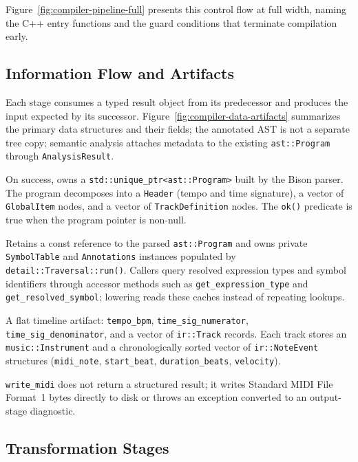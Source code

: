 Figure~\ref{fig:compiler-pipeline-full} presents this control flow at full width, naming the C++ entry functions and
the guard conditions that terminate compilation early.

\subsection{Information Flow and Artifacts}\label{detail-subsec:information-flow-and-artifacts}

Each stage consumes a typed result object from its predecessor and produces the input expected by its successor.
Figure~\ref{fig:compiler-data-artifacts} summarizes the primary data structures and their fields; the annotated AST is
not a separate tree copy; semantic analysis attaches metadata to the existing \texttt{ast::Program} through
\texttt{AnalysisResult}.

On success, owns a \texttt{std::unique\_ptr\textless ast::Program\textgreater{}} built by the Bison parser.
The program decomposes into a \texttt{Header} (tempo and time signature), a vector of \texttt{GlobalItem} nodes, and a
vector of \texttt{TrackDefinition} nodes.
The \texttt{ok()} predicate is true when the program pointer is non-null.

Retains a const reference to the parsed \texttt{ast::Program} and owns private \texttt{SymbolTable} and
\texttt{Annotations} instances populated by \texttt{detail::Traversal::run()}.
Callers query resolved expression types and symbol identifiers through accessor methods such as
\texttt{get\_expression\_type} and \texttt{get\_resolved\_symbol}; lowering reads these caches instead of repeating
lookups.

A flat timeline artifact: \texttt{tempo\_bpm}, \texttt{time\_sig\_numerator}, \texttt{time\_sig\_denominator}, and a
vector of \texttt{ir::Track} records.
Each track stores an \texttt{music::Instrument} and a chronologically sorted vector of \texttt{ir::NoteEvent} structures
(\texttt{midi\_note}, \texttt{start\_beat}, \texttt{duration\_beats}, \texttt{velocity}).

\texttt{write\_midi} does not return a structured result; it writes Standard MIDI File Format~1 bytes directly to disk
or throws an exception converted to an output-stage diagnostic.

\subsection{Transformation Stages}\label{detail-subsec:transformation-stages}

